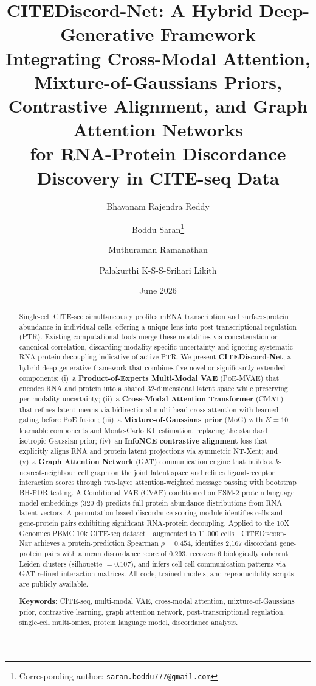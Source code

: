 \documentclass[11pt,a4paper]{article}
\title{%
  \textbf{CITEDiscord-Net: A Hybrid Deep-Generative Framework} \\[4pt]
  \textbf{Integrating Cross-Modal Attention, Mixture-of-Gaussians Priors,} \\[4pt]
  \textbf{Contrastive Alignment, and Graph Attention Networks} \\[4pt]
  \textbf{for RNA-Protein Discordance Discovery in CITE-seq Data}
}
\author[1]{Bhavanam Rajendra Reddy}
\author[1]{Boddu Saran\thanks{Corresponding author: \texttt{saran.boddu777@gmail.com}}}
\author[1]{Muthuraman Ramanathan}
\author[1]{Palakurthi K-S-S-Srihari Likith}
\affil[1]{%
  Amrita School of Artificial Intelligence, \\
  Amrita Vishwa Vidyapeetham, Coimbatore 641112, India
}
\date{June 2026}
\newcommand{\mvae}{\textsc{MVAE}}
\newcommand{\cvae}{\textsc{CVAE}}
\newcommand{\cmat}{\textsc{CMAT}}
\newcommand{\mog}{\textsc{MoG}}
\newcommand{\gat}{\textsc{GAT}}
\newcommand{\poe}{\textsc{PoE}}
\newcommand{\citenet}{\textsc{CITEDiscord-Net}}
\begin{document}
\maketitle
    \begin{abstract}
\noindent
Single-cell CITE-seq simultaneously profiles mRNA transcription and surface-protein abundance in individual cells, offering a unique lens into post-transcriptional regulation (PTR).
Existing computational tools merge these modalities via concatenation or canonical correlation, discarding modality-specific uncertainty and ignoring systematic RNA-protein decoupling indicative of active PTR.
We present \textbf{CITEDiscord-Net}, a hybrid deep-generative framework that combines five novel or significantly extended components:
(i)~a \textbf{Product-of-Experts Multi-Modal VAE} (\poe-\mvae) that encodes RNA and protein into a shared 32-dimensional latent space while preserving per-modality uncertainty;
(ii)~a \textbf{Cross-Modal Attention Transformer} (\cmat) that refines latent means via bidirectional multi-head cross-attention with learned gating before \poe{} fusion;
(iii)~a \textbf{Mixture-of-Gaussians prior} (\mog) with $K{=}10$ learnable components and Monte-Carlo KL estimation, replacing the standard isotropic Gaussian prior;
(iv)~an \textbf{InfoNCE contrastive alignment} loss that explicitly aligns RNA and protein latent projections via symmetric NT-Xent;
and (v)~a \textbf{Graph Attention Network} (\gat) communication engine that builds a $k$-nearest-neighbour cell graph on the joint latent space and refines ligand-receptor interaction scores through two-layer attention-weighted message passing with bootstrap BH-FDR testing.
A Conditional VAE (\cvae) conditioned on ESM-2 protein language model embeddings (320-d) predicts full protein abundance distributions from RNA latent vectors.
A permutation-based discordance scoring module identifies cells and gene-protein pairs exhibiting significant RNA-protein decoupling.
Applied to the 10X Genomics PBMC 10k CITE-seq dataset---augmented to 11,000 cells---\citenet{} achieves a protein-prediction Spearman $\rho = 0.454$, identifies 2,167 discordant gene-protein pairs with a mean discordance score of $0.293$, recovers 6 biologically coherent Leiden clusters (silhouette $= 0.107$), and infers cell-cell communication patterns via GAT-refined interaction matrices.
All code, trained models, and reproducibility scripts are publicly available.

\vspace{6pt}
\noindent\textbf{Keywords:}
CITE-seq, multi-modal VAE, cross-modal attention, mixture-of-Gaussians prior, contrastive learning, graph attention network, post-transcriptional regulation, single-cell multi-omics, protein language model, discordance analysis.
    \end{abstract}
    \vspace{12pt}
\end{document}

